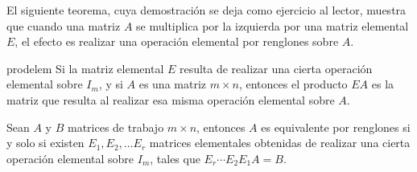 El siguiente teorema, cuya demostración se deja como ejercicio al lector, muestra que cuando una matriz $A$ se multiplica por la izquierda por una matriz elemental $E$, el efecto es realizar una operación elemental por renglones sobre $A$.

\begin{theorem}{}{prodelem}
    Si la matriz elemental $E$ resulta de realizar una cierta operación elemental sobre $I_m$, y si $A$ es una matriz $m \times n$, entonces el producto $EA$ es la matriz que resulta al realizar esa misma operación elemental sobre $A$.
\end{theorem}

\begin{corollary}{}{}
    Sean $A$ y $B$ matrices de trabajo $m \times n$, entonces $A$ es equivalente por renglones si y solo si existen $E_1, E_2, \dots E_r$ matrices elementales obtenidas de realizar una cierta operación elemental sobre $I_m$, tales que $E_r \cdots E_2E_1A = B$.
\end{corollary}

